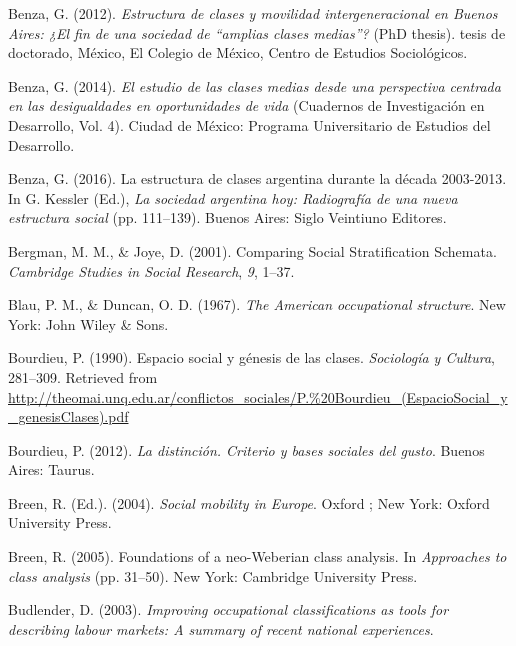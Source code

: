 \documentclass[
]{article}
\newlength{\cslhangindent}
\newlength{\cslentryspacingunit} %
\newenvironment{CSLReferences}[2] %
 {%
  \setlength{\parindent}{0pt}
  \ifodd #1
  \let\oldpar\par
  \def\par{\hangindent=\cslhangindent\oldpar}
  \fi
  \setlength{\parskip}{#2\cslentryspacingunit}
 }%
 {}
\begin{document}
\begin{CSLReferences}{1}{0}
\leavevmode{}%
Benza, G. (2012). \emph{Estructura de clases y movilidad intergeneracional en {Buenos} {Aires}: ¿El fin de una sociedad de {``amplias clases medias''}?} (PhD thesis). tesis de doctorado, México, El Colegio de México, Centro de Estudios Sociológicos.

\leavevmode{}%
Benza, G. (2014). \emph{El estudio de las clases medias desde una perspectiva centrada en las desigualdades en oportunidades de vida} (Cuadernos de Investigación en Desarrollo, Vol. 4). Ciudad de México: Programa Universitario de Estudios del Desarrollo.

\leavevmode{}%
Benza, G. (2016). La estructura de clases argentina durante la década 2003-2013. In G. Kessler (Ed.), \emph{La sociedad argentina hoy: Radiografía de una nueva estructura social} (pp. 111--139). Buenos Aires: Siglo Veintiuno Editores.

\leavevmode{}%
Bergman, M. M., \& Joye, D. (2001). Comparing {Social} {Stratification} {Schemata}. \emph{Cambridge Studies in Social Research}, \emph{9}, 1--37.

\leavevmode{}%
Blau, P. M., \& Duncan, O. D. (1967). \emph{The {American} occupational structure}. New York: John Wiley \& Sons.

\leavevmode{}%
Bourdieu, P. (1990). Espacio social y génesis de las clases. \emph{Sociología y Cultura}, 281--309. Retrieved from \url{http://theomai.unq.edu.ar/conflictos_sociales/P.\%20Bourdieu_(EspacioSocial_y_genesisClases).pdf}

\leavevmode{}%
Bourdieu, P. (2012). \emph{La distinción. {Criterio} y bases sociales del gusto}. Buenos Aires: Taurus.

\leavevmode{}%
Breen, R. (Ed.). (2004). \emph{Social mobility in {Europe}}. Oxford ; New York: Oxford University Press.

\leavevmode{}%
Breen, R. (2005). Foundations of a neo-{Weberian} class analysis. In \emph{Approaches to class analysis} (pp. 31--50). New York: Cambridge University Press.

\leavevmode{}%
Budlender, D. (2003). \emph{Improving occupational classifications as tools for describing labour markets: {A} summary of recent national experiences}.


\end{CSLReferences}
\end{document}
